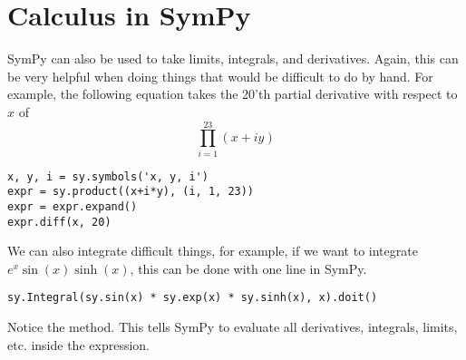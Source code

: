 \section*{Calculus in SymPy}
SymPy can also be used to take limits, integrals, and derivatives.
Again, this can be very helpful when doing things that would be difficult to do by hand.
For example, the following equation takes the 20'th partial derivative with respect to $x$ of
\begin{equation*}
\prod_{i=1}^{23} \left(x+i y\right)
\end{equation*}
\begin{lstlisting}
x, y, i = sy.symbols('x, y, i')
expr = sy.product((x+i*y), (i, 1, 23))
expr = expr.expand()
expr.diff(x, 20)
\end{lstlisting}

We can also integrate difficult things, for example, if we want to integrate $e^x\sin(x)\sinh(x)$, this can be done with one line in SymPy.
\begin{lstlisting}
sy.Integral(sy.sin(x) * sy.exp(x) * sy.sinh(x), x).doit()
\end{lstlisting}
Notice the  method.
This tells SymPy to evaluate all derivatives, integrals, limits, etc. inside the expression.

